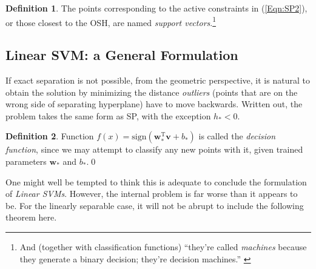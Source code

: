 \documentclass[11pt,a4paper]{article}
\theoremstyle{definition}
\newtheorem{defi}{Definition}
\renewcommand{\vec}[1]{\boldsymbol{#1}}
\begin{document}
      \begin{defi}
        The points corresponding to the active constraints in (\ref{Eqn:SP2}), or those closest to the OSH, are named \textit{support vectors}.\footnote{And (together with classification functions) ``they're called \textit{machines} because they generate a binary decision; they're decision machines.'' \cite[p.127]{harrington2012machine}}
      \end{defi}

    \subsection{\label{Sec:LSVM}Linear SVM: a General Formulation}
      If exact separation is not possible, from the geometric perspective, it is natural to obtain the solution by minimizing the distance \textit{outliers} (points that are on the wrong side of separating hyperplane) have to move backwards. Written out, the problem takes the same form as SP, with the exception $h_{*}<0$.

      \begin{defi}
        Function $f(x)=\text{sign}(\vec{w}_{*}^{\mathrm{T}}\vec{v}+b_{*})$ is called the \textit{decision function}, since we may attempt to classify any new points with it, given trained parameters $\vec{w}_{*}$ and $b_{*}$.\qed
      \end{defi}

      One might well be tempted to think this is adequate to conclude the formulation of \textit{Linear SVMs}. However, the internal problem is far worse than it appears to be. For the linearly separable case, it will not be abrupt to include the following theorem here.
\end{document}
